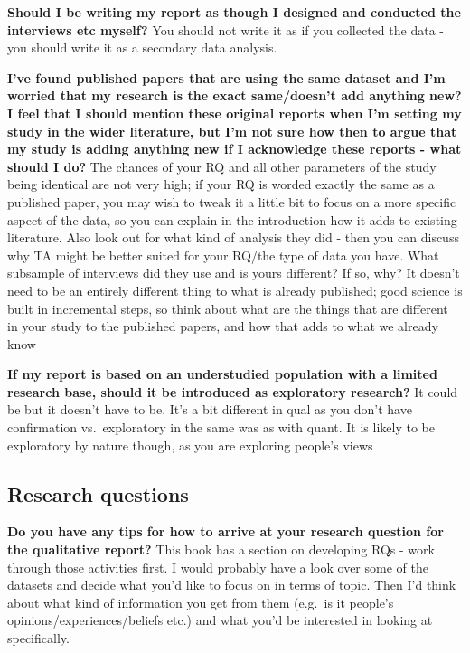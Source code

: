 \documentclass[
  english,
  letterpaper,
  DIV=11,
  numbers=noendperiod]{scrreprt}
\begin{document}
\textbf{Should I be writing my report as though I designed and conducted
the interviews etc myself?} You should not write it as if you collected
the data - you should write it as a secondary data analysis.

\textbf{I've found published papers that are using the same dataset and
I'm worried that my research is the exact same/doesn't add anything new?
I feel that I should mention these original reports when I'm setting my
study in the wider literature, but I'm not sure how then to argue that
my study is adding anything new if I acknowledge these reports - what
should I do?} The chances of your RQ and all other parameters of the
study being identical are not very high; if your RQ is worded exactly
the same as a published paper, you may wish to tweak it a little bit to
focus on a more specific aspect of the data, so you can explain in the
introduction how it adds to existing literature. Also look out for what
kind of analysis they did - then you can discuss why TA might be better
suited for your RQ/the type of data you have. What subsample of
interviews did they use and is yours different? If so, why? It doesn't
need to be an entirely different thing to what is already published;
good science is built in incremental steps, so think about what are the
things that are different in your study to the published papers, and how
that adds to what we already know

\textbf{If my report is based on an understudied population with a
limited research base, should it be introduced as exploratory research?}
It could be but it doesn't have to be. It's a bit different in qual as
you don't have confirmation vs.~exploratory in the same was as with
quant. It is likely to be exploratory by nature though, as you are
exploring people's views

\subsection{Research questions}\label{research-questions}

\textbf{Do you have any tips for how to arrive at your research question
for the qualitative report?} This book has a section on developing RQs -
work through those activities first. I would probably have a look over
some of the datasets and decide what you'd like to focus on in terms of
topic. Then I'd think about what kind of information you get from them
(e.g.~is it people's opinions/experiences/beliefs etc.) and what you'd
be interested in looking at specifically.
\end{document}
